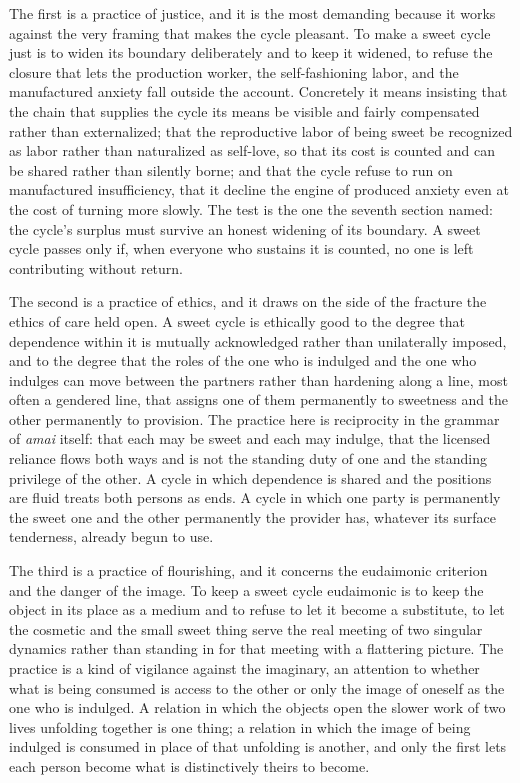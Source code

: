 The first is a practice of justice, and it is the most demanding because it works against the very framing that makes the cycle pleasant. To make a sweet cycle just is to widen its boundary deliberately and to keep it widened, to refuse the closure that lets the production worker, the self-fashioning labor, and the manufactured anxiety fall outside the account. Concretely it means insisting that the chain that supplies the cycle its means be visible and fairly compensated rather than externalized; that the reproductive labor of being sweet be recognized as labor rather than naturalized as self-love, so that its cost is counted and can be shared rather than silently borne; and that the cycle refuse to run on manufactured insufficiency, that it decline the engine of produced anxiety even at the cost of turning more slowly. The test is the one the seventh section named: the cycle's surplus must survive an honest widening of its boundary. A sweet cycle passes only if, when everyone who sustains it is counted, no one is left contributing without return.

The second is a practice of ethics, and it draws on the side of the fracture the ethics of care held open. A sweet cycle is ethically good to the degree that dependence within it is mutually acknowledged rather than unilaterally imposed, and to the degree that the roles of the one who is indulged and the one who indulges can move between the partners rather than hardening along a line, most often a gendered line, that assigns one of them permanently to sweetness and the other permanently to provision. The practice here is reciprocity in the grammar of \textit{amai} itself: that each may be sweet and each may indulge, that the licensed reliance flows both ways and is not the standing duty of one and the standing privilege of the other. A cycle in which dependence is shared and the positions are fluid treats both persons as ends. A cycle in which one party is permanently the sweet one and the other permanently the provider has, whatever its surface tenderness, already begun to use.

The third is a practice of flourishing, and it concerns the eudaimonic criterion and the danger of the image. To keep a sweet cycle eudaimonic is to keep the object in its place as a medium and to refuse to let it become a substitute, to let the cosmetic and the small sweet thing serve the real meeting of two singular dynamics rather than standing in for that meeting with a flattering picture. The practice is a kind of vigilance against the imaginary, an attention to whether what is being consumed is access to the other or only the image of oneself as the one who is indulged. A relation in which the objects open the slower work of two lives unfolding together is one thing; a relation in which the image of being indulged is consumed in place of that unfolding is another, and only the first lets each person become what is distinctively theirs to become.

